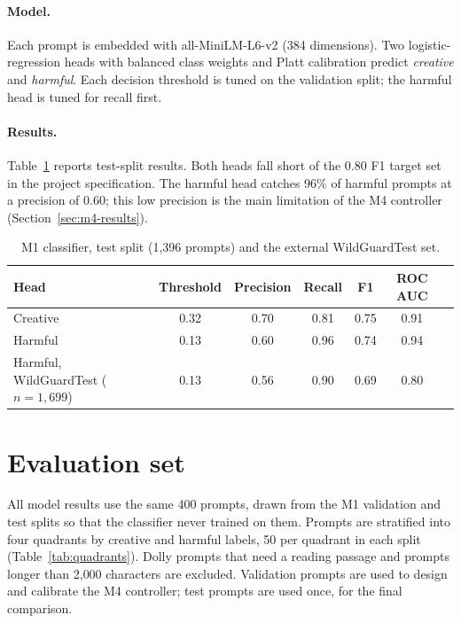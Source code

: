 \documentclass[11pt,a4paper]{article}
\begin{document}
\paragraph{Model.} Each prompt is embedded with all-MiniLM-L6-v2\cite{reimers2019sbert,wang2020minilm} (384 dimensions). Two logistic-regression heads with balanced class weights and Platt calibration predict \emph{creative} and \emph{harmful}. Each decision threshold is tuned on the validation split; the harmful head is tuned for recall first.

\paragraph{Results.} Table~\ref{tab:m1} reports test-split results. Both heads fall short of the 0.80 F1 target set in the project specification. The harmful head catches 96\% of harmful prompts at a precision of 0.60; this low precision is the main limitation of the M4 controller (Section~\ref{sec:m4-results}).

\begin{table}[h]
  \centering
  \caption{M1 classifier, test split (1{,}396 prompts) and the external WildGuardTest set.}
  \label{tab:m1}
  \begin{tabular}{lcccccc}
    \toprule
    Head & Threshold & Precision & Recall & F1 & ROC AUC \\
    \midrule
    Creative & 0.32 & 0.70 & 0.81 & 0.75 & 0.91 \\
    Harmful & 0.13 & 0.60 & 0.96 & 0.74 & 0.94 \\
    Harmful, WildGuardTest ($n=1{,}699$) & 0.13 & 0.56 & 0.90 & 0.69 & 0.80 \\
    \bottomrule
  \end{tabular}
\end{table}

\section{Evaluation set}
\label{sec:evalset}

All model results use the same 400 prompts, drawn from the M1 validation and test splits so that the classifier never trained on them. Prompts are stratified into four quadrants by creative and harmful labels, 50 per quadrant in each split (Table~\ref{tab:quadrants}). Dolly prompts that need a reading passage and prompts longer than 2{,}000 characters are excluded. Validation prompts are used to design and calibrate the M4 controller; test prompts are used once, for the final comparison.
\end{document}
